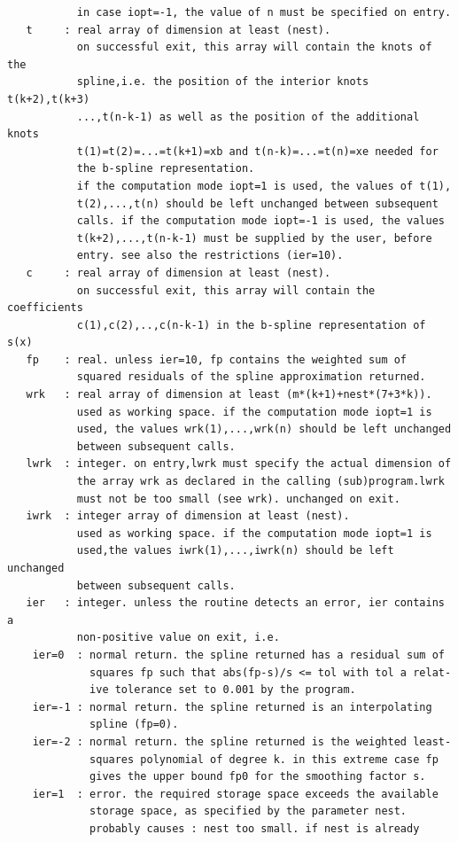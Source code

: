 \documentclass[11pt,twoside]{article}
\begin{document}
\begin{verbatim}
           in case iopt=-1, the value of n must be specified on entry.
   t     : real array of dimension at least (nest).
           on successful exit, this array will contain the knots of the
           spline,i.e. the position of the interior knots t(k+2),t(k+3)
           ...,t(n-k-1) as well as the position of the additional knots
           t(1)=t(2)=...=t(k+1)=xb and t(n-k)=...=t(n)=xe needed for
           the b-spline representation.
           if the computation mode iopt=1 is used, the values of t(1),
           t(2),...,t(n) should be left unchanged between subsequent
           calls. if the computation mode iopt=-1 is used, the values
           t(k+2),...,t(n-k-1) must be supplied by the user, before
           entry. see also the restrictions (ier=10).
   c     : real array of dimension at least (nest).
           on successful exit, this array will contain the coefficients
           c(1),c(2),..,c(n-k-1) in the b-spline representation of s(x)
   fp    : real. unless ier=10, fp contains the weighted sum of
           squared residuals of the spline approximation returned.
   wrk   : real array of dimension at least (m*(k+1)+nest*(7+3*k)).
           used as working space. if the computation mode iopt=1 is
           used, the values wrk(1),...,wrk(n) should be left unchanged
           between subsequent calls.
   lwrk  : integer. on entry,lwrk must specify the actual dimension of
           the array wrk as declared in the calling (sub)program.lwrk
           must not be too small (see wrk). unchanged on exit.
   iwrk  : integer array of dimension at least (nest).
           used as working space. if the computation mode iopt=1 is
           used,the values iwrk(1),...,iwrk(n) should be left unchanged
           between subsequent calls.
   ier   : integer. unless the routine detects an error, ier contains a
           non-positive value on exit, i.e.
    ier=0  : normal return. the spline returned has a residual sum of
             squares fp such that abs(fp-s)/s <= tol with tol a relat-
             ive tolerance set to 0.001 by the program.
    ier=-1 : normal return. the spline returned is an interpolating
             spline (fp=0).
    ier=-2 : normal return. the spline returned is the weighted least-
             squares polynomial of degree k. in this extreme case fp
             gives the upper bound fp0 for the smoothing factor s.
    ier=1  : error. the required storage space exceeds the available
             storage space, as specified by the parameter nest.
             probably causes : nest too small. if nest is already

\end{verbatim}
\end{document}
